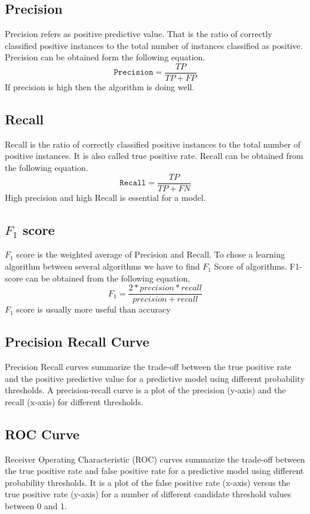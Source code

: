 \subsection{\textbf{Precision}}
Precision refers as positive predictive value. That is the ratio of correctly classified positive instances to the total number of instances classified as positive. Precision can be obtained form  the following equation.
\begin{equation}
    \texttt{Precision} = \frac{TP}{TP+FP}
\end{equation}
If precision is high then the algorithm is doing well.

\subsection{\textbf{Recall}}
Recall is the ratio of correctly classified positive instances to the total number of positive instances. It is also called true positive rate. Recall can be obtained from the following equation.
\begin{equation}
    \texttt{Recall} = \frac{TP}{TP+FN}
\end{equation}
High precision and high Recall is essential for a model.

\subsection{\textbf{$F_1$ score}}
 $F_1$ score is the weighted average of Precision and Recall. To chose a learning algorithm between several algorithms we have to find $F_1$ Score of algorithms. F1-score can be obtained from the following equation,
 \begin{equation}
     F_1 = \frac{2*precision*recall}{precision+recall}
 \end{equation}
$F_1$ score is usually more useful than accuracy

\subsection{\textbf{Precision Recall Curve}}
Precision Recall curves summarize the trade-off between the true positive rate and the positive predictive value for a predictive model using different probability thresholds. A precision-recall curve is a plot of the precision (y-axis) and the recall (x-axis) for different thresholds.

\subsection{\textbf{ROC Curve}}
Receiver Operating Characteristic (ROC) curves summarize the trade-off between the true positive rate and false positive rate for a predictive model using different probability thresholds.%
It is a plot of the false positive rate (x-axis) versus the true positive rate (y-axis) for a number of different candidate threshold values between 0 and 1.